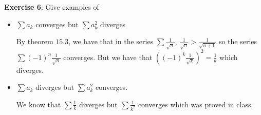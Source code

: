 \documentclass{article}
\begin{document}
\textbf{Exercise 6}: Give examples of
    \begin{itemize}
        \item $\sum a_{k}$ converges but $\sum a_{k}^{2}$ diverges
            \begin{answer}
                By theorem $15.3$, we have that in the series $\sum\frac{1}{\sqrt{n}}$, $\frac{1}{\sqrt{n}} > \frac{1}{\sqrt{n + 1}}$ so the series $\sum(- 1)^{n}\frac{1}{\sqrt{n}}$ converges. But we have that $((-1)^{k}\frac{1}{\sqrt{k}})^{2} = \frac{1}{k}$ which diverges.
            \end{answer}

        \item $\sum a_{k}$ diverges but $\sum a^{2}_{k}$ converges. 
            \begin{answer}
                We know that $\sum\frac{1}{k}$ diverges but $\sum\frac{1}{k^{2}}$ converges which was proved in class.
            \end{answer}
    \end{itemize}
\end{document}

